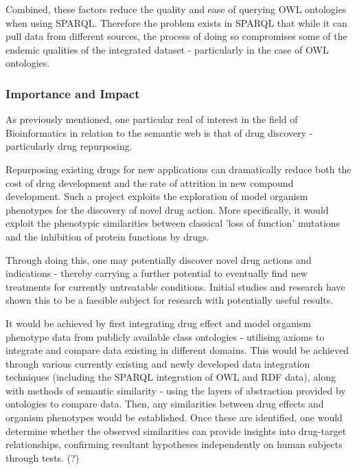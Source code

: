 \documentclass{article}
\begin{document}
Combined, these factors reduce the quality and ease of querying OWL ontologies when 
using SPARQL. Therefore the problem exists in SPARQL that while it can pull data
from different sources, the process of doing so compromises some of the endemic
qualities of the integrated dataset - particularly in the case of OWL
ontologies.

\subsubsection{Importance and Impact}


As previously mentioned, one particular real of interest in the field of
Bioinformatics in relation to the semantic web is that of drug discovery -
particularly drug repurposing\cite{pharmgkb}.

Repurposing existing drugs for new applications can dramatically reduce both
the cost of drug development and the rate of attrition in new compound
development. Such a project exploits the exploration of model organism
phenotypes for the discovery of novel drug action. More specifically, it would
exploit the phenotypic similarities between classical 'loss of function'
mutations and the inhibition of protein functions by drugs.

Through doing this, one may potentially discover novel drug actions and
indications - thereby carrying a further potential to eventually find new treatments for
currently untreatable conditions. Initial studies and research have shown this
to be a faesible subject for research with potentially useful
results.\cite{drugrepurposeinitial}

It would be achieved by first integrating drug effect and model organism
phenotype data from publicly available class ontologies - utilising axioms to
integrate and compare data existing in different domains. This would be achieved
through various currently existing and  newly developed data integration techniques 
(including the SPARQL integration of OWL and RDF data), along with methods of
semantic similarity - using the layers of abstraction provided by ontologies
to compare data. Then, any similarities between drug effects and organism
phenotypes would be established. Once these are identified, one would determine 
whether the observed similarities can provide insights into drug-target relationships, 
confirming resultant hypotheses independently on human subjects through tests.
(?)
\end{document}
